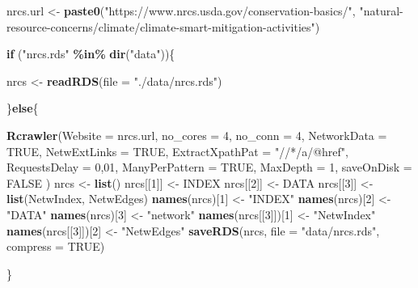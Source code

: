 \documentclass[
]{article}
\newenvironment{Shaded}{\begin{snugshade}}{\end{snugshade}}
\newcommand{\AttributeTok}[1]{\textcolor[rgb]{0.13,0.29,0.53}{#1}}
\newcommand{\ConstantTok}[1]{\textcolor[rgb]{0.56,0.35,0.01}{#1}}
\newcommand{\ControlFlowTok}[1]{\textcolor[rgb]{0.13,0.29,0.53}{\textbf{#1}}}
\newcommand{\DecValTok}[1]{\textcolor[rgb]{0.00,0.00,0.81}{#1}}
\newcommand{\FunctionTok}[1]{\textcolor[rgb]{0.13,0.29,0.53}{\textbf{#1}}}
\newcommand{\NormalTok}[1]{#1}
\newcommand{\OtherTok}[1]{\textcolor[rgb]{0.56,0.35,0.01}{#1}}
\newcommand{\SpecialCharTok}[1]{\textcolor[rgb]{0.81,0.36,0.00}{\textbf{#1}}}
\newcommand{\StringTok}[1]{\textcolor[rgb]{0.31,0.60,0.02}{#1}}
\begin{document}
\begin{Shaded}
\begin{Highlighting}[]
\NormalTok{nrcs.url }\OtherTok{\textless{}{-}} \FunctionTok{paste0}\NormalTok{(}\StringTok{"https://www.nrcs.usda.gov/conservation{-}basics/"}\NormalTok{, }
                   \StringTok{"natural{-}resource{-}concerns/climate/climate{-}smart{-}mitigation{-}activities"}\NormalTok{)}

\ControlFlowTok{if}\NormalTok{ (}\StringTok{"nrcs.rds"} \SpecialCharTok{\%in\%} \FunctionTok{dir}\NormalTok{(}\StringTok{"data"}\NormalTok{))\{}

\NormalTok{    nrcs }\OtherTok{\textless{}{-}} \FunctionTok{readRDS}\NormalTok{(}\AttributeTok{file =} \StringTok{"./data/nrcs.rds"}\NormalTok{)}

\NormalTok{\}}\ControlFlowTok{else}\NormalTok{\{}

    \FunctionTok{Rcrawler}\NormalTok{(}\AttributeTok{Website =}\NormalTok{ nrcs.url,}
             \AttributeTok{no\_cores =} \DecValTok{4}\NormalTok{, }\AttributeTok{no\_conn =} \DecValTok{4}\NormalTok{, }
             \AttributeTok{NetworkData =} \ConstantTok{TRUE}\NormalTok{,}
             \AttributeTok{NetwExtLinks =} \ConstantTok{TRUE}\NormalTok{, }
             \AttributeTok{ExtractXpathPat =} \StringTok{"//*/a/@href"}\NormalTok{,}
             \AttributeTok{RequestsDelay =} \DecValTok{0}\NormalTok{,}\DecValTok{01}\NormalTok{,}
             \AttributeTok{ManyPerPattern =} \ConstantTok{TRUE}\NormalTok{, }\AttributeTok{MaxDepth =} \DecValTok{1}\NormalTok{, }
             \AttributeTok{saveOnDisk =} \ConstantTok{FALSE}
\NormalTok{             )}
\NormalTok{    nrcs }\OtherTok{\textless{}{-}} \FunctionTok{list}\NormalTok{()}
\NormalTok{    nrcs[[}\DecValTok{1}\NormalTok{]] }\OtherTok{\textless{}{-}}\NormalTok{ INDEX}
\NormalTok{    nrcs[[}\DecValTok{2}\NormalTok{]] }\OtherTok{\textless{}{-}}\NormalTok{ DATA}
\NormalTok{    nrcs[[}\DecValTok{3}\NormalTok{]] }\OtherTok{\textless{}{-}} \FunctionTok{list}\NormalTok{(NetwIndex, NetwEdges)}
    \FunctionTok{names}\NormalTok{(nrcs)[}\DecValTok{1}\NormalTok{] }\OtherTok{\textless{}{-}} \StringTok{"INDEX"}
    \FunctionTok{names}\NormalTok{(nrcs)[}\DecValTok{2}\NormalTok{] }\OtherTok{\textless{}{-}} \StringTok{"DATA"}
    \FunctionTok{names}\NormalTok{(nrcs)[}\DecValTok{3}\NormalTok{] }\OtherTok{\textless{}{-}} \StringTok{"network"}
    \FunctionTok{names}\NormalTok{(nrcs[[}\DecValTok{3}\NormalTok{]])[}\DecValTok{1}\NormalTok{] }\OtherTok{\textless{}{-}} \StringTok{"NetwIndex"}
    \FunctionTok{names}\NormalTok{(nrcs[[}\DecValTok{3}\NormalTok{]])[}\DecValTok{2}\NormalTok{] }\OtherTok{\textless{}{-}} \StringTok{"NetwEdges"}
    \FunctionTok{saveRDS}\NormalTok{(nrcs, }\AttributeTok{file =} \StringTok{"data/nrcs.rds"}\NormalTok{, }\AttributeTok{compress =} \ConstantTok{TRUE}\NormalTok{)}

\NormalTok{\}}
\end{Highlighting}
\end{Shaded}
\end{document}
